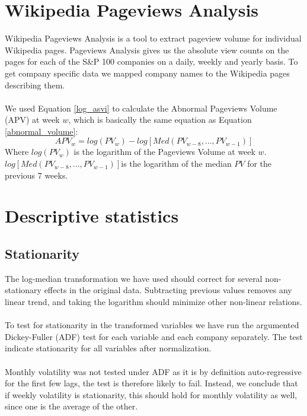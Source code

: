\section{Wikipedia Pageviews Analysis}

Wikipedia Pageviews Analysis is a tool to extract pageview volume for individual Wikipedia pages. Pageviews Analysis gives us the absolute view counts on the pages for each of the S\&P 100 companies on a daily, weekly and yearly basis. To get company specific data we mapped company names to the Wikipedia pages describing them.
\\\\
We used Equation \eqref{log_asvi} to calculate the Abnormal Pageviews Volume (APV) at week $w$, which is basically the same equation as Equation \eqref{abnormal_volume}:
\begin{equation}
   \label{abnormal_pageviews_volume} 
   APV_{w} = log(PV_{w}) - log[Med(PV_{w-8},...,PV_{w-1})] 
\end{equation}
   Where $log(PV_{w})$ is the logarithm of the Pageviews Volume at week $w$. $log[Med(PV_{w-8},...,PV_{w-1})]$is the logarithm of the median $PV$ for the previous 7 weeks.


\section{Descriptive statistics}

\subsection{Stationarity}

The log-median transformation we have used should correct for several non-stationary effects in the original data. 
Subtracting previous values removes any linear trend, and taking the logarithm should minimize other non-linear relations. 
\\\\
To test for stationarity in the transformed variables we have run the argumented Dickey-Fuller (ADF) test for each variable and each company separately. The test indicate stationarity for all variables after normalization. 
\\\\
Monthly volatility was not tested under ADF as it is by definition auto-regressive for the first few lags, the test is therefore likely to fail. Instead, we conclude that if weekly volatility is stationarity, this should hold for monthly volatility as well, since one is the average of the other.

